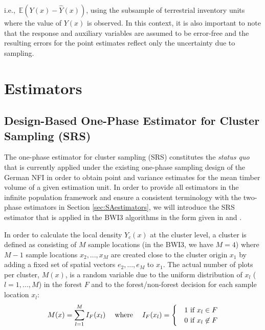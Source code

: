 \documentclass[remotesensing,article,accept,moreauthors,pdftex,10pt,a4paper]{Definitions/mdpi}
\newcommand{\EX}{\mathbb{E}}
\begin{document}
i.e.,~$\EX{(Y(x)-\hat{Y}(x))}$, using the subsample of terrestrial inventory units where the value of $Y(x)$ is observed. In this context, it is also important to note that the response and auxiliary variables are assumed to be error-free and the resulting errors for the point estimates reflect only the uncertainty due to sampling.


\section{Estimators}
\label{sec:estimators}

\vspace{-6pt}
\subsection{Design-Based One-Phase Estimator for Cluster Sampling (SRS)}
\label{sec:srs_estimator}

The one-phase estimator for cluster sampling (SRS) constitutes the \textit{status quo} that is currently applied under the existing one-phase sampling design of the German NFI in order to obtain point and variance estimates for the mean timber volume of a given estimation unit. In order to provide all estimators in the infinite population framework and ensure a consistent terminology with the two-phase estimators in Section \ref{sec:SAestimators}, we will introduce the SRS estimator that is applied in the BWI3 algorithms \citep{bwi3_ausw} in the form given in \citet{mandallaz2008} and \citet{mandallaz2016}.\par 
In order to calculate the local density $Y_{c}(x)$ at the cluster level, a cluster is defined as consisting of $M$ sample locations (in the BWI3, we have $M = 4$) where $M-1$ sample locations $x_2, ..., x_M$ are created close to the cluster origin $x_1$ by adding a fixed set of spatial vectors $e_2, ..., e_M$ to $x_1$. The actual number of plots per cluster, $M(x)$, is a random variable due to the uniform distribution of $x_l$ ($l = 1, ..., M$) in the forest $F$ and to the forest/non-forest decision for each sample location $x_l$:
\begin{equation}\label{eq:Mx}
M(x) = \sum_{l = 1}^{M}I_{F}(x_l) \hspace{3ex} \text{where} \hspace{3ex} I_F(x_l) = \begin{cases}&1 \text{ if $x_l \in F$}\\
&0 \text{ if $x_l\not\in F$}
\end{cases}
\end{equation}
\end{document}
